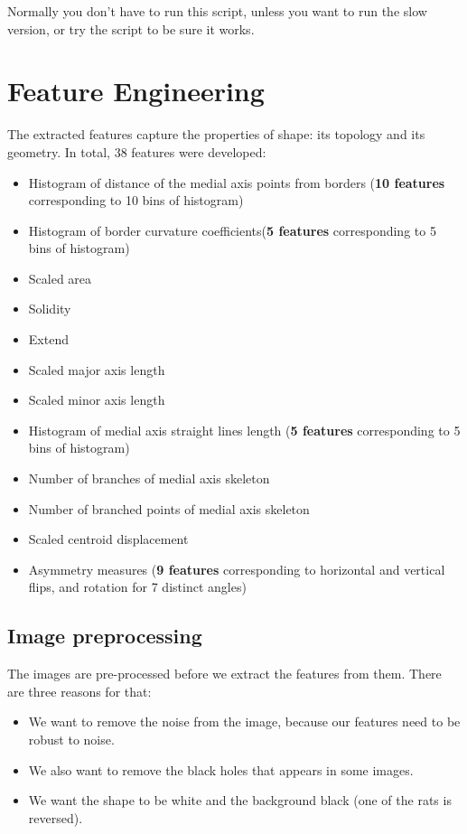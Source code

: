 \documentclass[12pt]{article}
\begin{document}
Normally you don't have to run this script, unless you want to run the slow version, or try the script to be sure it works.

\section{Feature Engineering}

The extracted features capture the properties of shape: its topology and its geometry. In total, 38 features were developed:

\begin{itemize}
	\item Histogram of distance of the medial axis points from borders (\textbf{10 features} corresponding to 10 bins of histogram)
	\item Histogram of border curvature coefficients(\textbf{5 features} corresponding to 5 bins of histogram)
	\item Scaled area
	\item Solidity
	\item Extend
	\item Scaled major axis length
	\item Scaled minor axis length
	\item Histogram of medial axis straight lines length (\textbf{5 features} corresponding to 5 bins of histogram)
	\item Number of branches of medial axis skeleton
	\item Number of branched points of medial axis skeleton
	\item Scaled centroid displacement
	\item Asymmetry measures (\textbf{9 features} corresponding to horizontal and vertical flips, and rotation for 7 distinct angles)
\end{itemize} 

\subsection{Image preprocessing}

The images are pre-processed before we extract the features from them. There are three reasons for that:
\begin{itemize}
	\item We want to remove the noise from the image, because our features need to be robust to noise.
        \item We also want to remove the black holes that appears in some images.
        \item We want the shape to be white and the background black (one of the rats is reversed).
\end{itemize}
\end{document}
